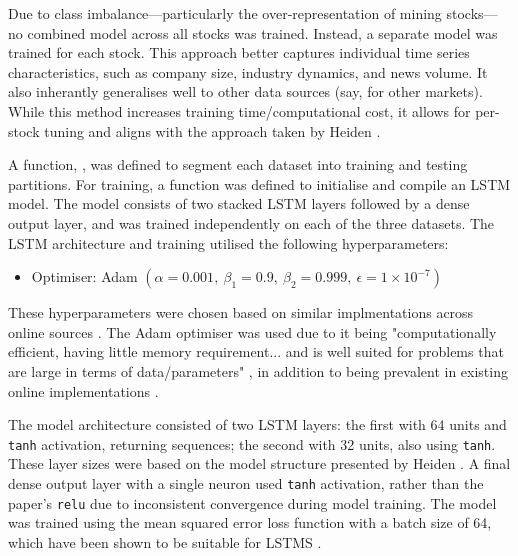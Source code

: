 Due to class imbalance—particularly the over-representation of mining stocks—no combined model across all stocks was trained. Instead, a separate model was trained for each stock. This approach better captures individual time series characteristics, such as company size, industry dynamics, and news volume. It also inherantly generalises well to other data sources (say, for other markets). While this method increases training time/computational cost, it allows for per-stock tuning and aligns with the approach taken by Heiden \cite{heiden_lstm}.





A function, , was defined to segment each dataset into training and testing partitions. For training, a function  was defined to initialise and compile an LSTM model. The model consists of two stacked LSTM layers followed by a dense output layer, and was trained independently on each of the three datasets.
The LSTM architecture and training utilised the following hyperparameters:
\begin{itemize}
    \item Optimiser: Adam \((\alpha = 0.001,\ \beta_1 = 0.9,\ \beta_2 = 0.999,\ \epsilon = 1 \times 10^{-7})\)
\end{itemize}

These hyperparameters were chosen based on similar implmentations across online sources \cite{hyperparameters,rnn_example,adam_keras_api_docs}. The Adam optimiser was used due to it being "computationally efficient, having little memory requirement... and is well suited for problems that are large in terms of data/parameters" \cite{adam_keras_api_docs,adam_paper}, in addition to being prevalent in existing online implementations \cite{rnn_example}.

The model architecture consisted of two LSTM layers: the first with 64 units and \texttt{tanh} activation, returning sequences; the second with 32 units, also using \texttt{tanh}. These layer sizes were based on the model structure presented by Heiden \cite{heiden_lstm}. A final dense output layer with a single neuron used \texttt{tanh} activation, rather than the paper's \texttt{relu} due to inconsistent convergence during model training. The model was trained using the mean squared error loss function with a batch size of 64, which have been shown to be suitable for LSTMS \cite{hyperparameters,rnn_example}. 

